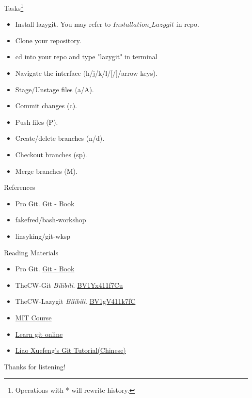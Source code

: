 \documentclass[aspectratio=169]{beamer}
\begin{document}
\begin{frame}{Tasks\footnote{Operations with * will rewrite history.}}
          \begin{itemize}[<+->]
              \item Install lazygit. You may refer to $Installation\_Lazygit$ in repo.
              \item Clone your repository.
              \item cd into your repo and type "lazygit" in terminal
              \item Navigate the interface (h/j/k/l/[/]/arrow keys).
              \item Stage/Unstage files (a/A).
              \item Commit changes (c).
              \item Push files (P).
              \item Create/delete branches (n/d).
              \item Checkout branches (sp).
              \item Merge branches (M).
          \end{itemize}
\end{frame}


\begin{frame}{References}
  \begin{itemize}
      \item Pro Git. \href{https://git-scm.com/book/en/v2}{Git - Book}
      \item fakefred/bash-workshop
      \item linsyking/git-wksp
  \end{itemize}
\end{frame}

\begin{frame}{Reading Materials}
  \begin{itemize}
      \item Pro Git. \href{https://git-scm.com/book/en/v2}{Git - Book}
      \item TheCW-Git \emph{Bilibili}. \href{https://www.bilibili.com/video/BV1Yx411f7Cu}{BV1Yx411f7Cu}
      \item TheCW-Lazygit \emph{Bilibili}. \href{https://www.bilibili.com/video/BV1gV411k7fC}{BV1gV411k7fC}
      \item \href{https://missing.csail.mit.edu/2020/course-shell/}{MIT Course}
      \item \href{https://learngitbranching.js.org/?locale=zh_CN}{Learn git online}
      \item \href{https://www.liaoxuefeng.com/wiki/896043488029600}{Liao Xuefeng's Git Tutorial(Chinese)}
  \end{itemize}
\end{frame}

\begin{frame}
  \Huge{\textcolor{UMBlue}{Thanks for listening!}}
\end{frame}
\end{document}
